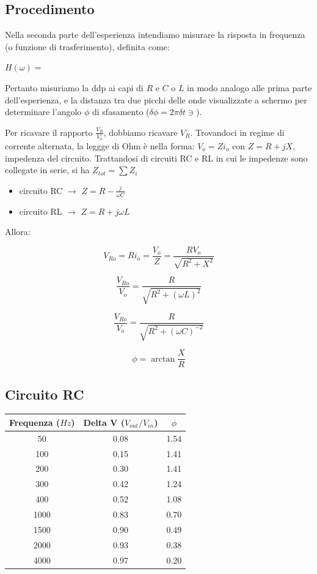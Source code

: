 \subsection{Procedimento}
Nella seconda parte dell'esperienza intendiamo misurare la risposta in frequenza (o funzione di trasferimento), definita come:

$H\left(\omega \right) = $  


Pertanto misuriamo la ddp ai capi di $R$ e $C$ o $L$ in modo analogo alle prima parte dell'esperienza, e la distanza tra due picchi delle onde visualizzate a schermo per determinare l'angolo $\phi$ di sfasamento ($\delta \phi = 2 \pi \delta t \ni$).

Per ricavare il rapporto $\frac{V_{R}}{V_{o}}$, dobbiamo ricavare $V_R$. Trovandoci in regime di corrente alternata, la leggge di Ohm è nella forma: $ V_o = Zi_o$ con $Z = R + jX$, impedenza del circuito.
Trattandosi di circuiti RC e RL in cui le impedenze sono collegate in serie, si ha $Z_{tot} = \sum Z_i$

\begin{itemize}
\item circuito RC $\rightarrow$ $Z=R-\frac{j}{\omega C}$
\item circuito RL $\rightarrow$ $Z=R+j\omega L$
\end{itemize}  

Allora: 

$$V_{Ro} = Ri_o = \frac{V_o}{Z} = \frac{RV_o}{\sqrt{R^2+X^2}} $$ 

$$\frac{V_{Ro}}{V_o} = \frac{R}{\sqrt{R^2+(\omega L)^2}}$$

$$\frac{V_{Ro}}{V_o} = \frac{R}{\sqrt{R^2+(\omega C)^{-2}}}$$

$$\phi = \arctan \frac{X}{R} $$



\subsection{Circuito RC}


\begin{center}
\begin{tabular}{*{3}{c}}
Frequenza ($Hz$) & Delta V ($V_{out}/V_{in}$) & $\phi$ \\
\midrule
50 & 0.08 & 1.54\\
100 & 0.15 & 1.41\\
200 & 0.30 & 1.41\\
300 & 0.42 & 1.24\\
400 & 0.52 & 1.08 \\
1000 & 0.83 & 0.70\\
1500 & 0.90 & 0.49\\
2000 & 0.93 & 0.38\\
4000 & 0.97 & 0.20 \\
\end{tabular}
\end{center}

